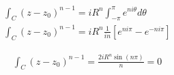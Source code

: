 \begin{gather*}
    \int_C (z - z_0)^{n-1} = iR^{n}\int_{-\pi}^{\pi} e^{ni\theta} d\theta\\
    \int_C (z - z_0)^{n-1} = iR^{n}\frac{1}{in}[e^{ni\pi}- e^{-ni\pi}]
\end{gather*}

\begin{mdframed}
    \vspace{-0.25cm}
    \begin{gather}
    \int_C (z - z_0)^{n-1} = \frac{2i R^{n}\sin(n\pi)}{n} = 0
\end{gather}
    \vspace{-0.3cm}
\end{mdframed}